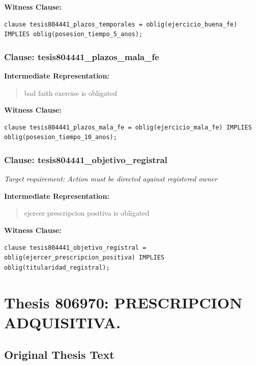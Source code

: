 \documentclass[11pt,a4paper]{article}
\begin{document}
\textbf{Witness Clause:}

\begin{lstlisting}[style=witnessstyle, language=Witness]
clause tesis804441_plazos_temporales = oblig(ejercicio_buena_fe) IMPLIES oblig(posesion_tiempo_5_anos);
\end{lstlisting}

\subsubsection{Clause: tesis804441\_plazos\_mala\_fe}

\textbf{Intermediate Representation:}

\begin{quote}
bad faith exercise is obligated
\end{quote}

\textbf{Witness Clause:}

\begin{lstlisting}[style=witnessstyle, language=Witness]
clause tesis804441_plazos_mala_fe = oblig(ejercicio_mala_fe) IMPLIES oblig(posesion_tiempo_10_anos);
\end{lstlisting}

\subsubsection{Clause: tesis804441\_objetivo\_registral}

\textit{Target requirement: Action must be directed against registered owner}

\textbf{Intermediate Representation:}

\begin{quote}
ejercer prescripcion positiva is obligated
\end{quote}

\textbf{Witness Clause:}

\begin{lstlisting}[style=witnessstyle, language=Witness]
clause tesis804441_objetivo_registral = oblig(ejercer_prescripcion_positiva) IMPLIES oblig(titularidad_registral);
\end{lstlisting}

\newpage

\section{Thesis 806970: PRESCRIPCION ADQUISITIVA.}
\label{thesis:806970}

\subsection{Original Thesis Text}
\end{document}
